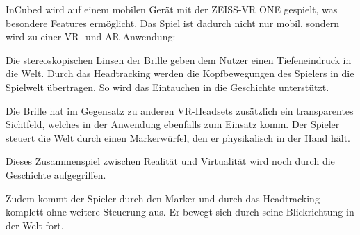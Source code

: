 
InCubed wird auf einem mobilen Gerät mit der ZEISS-VR ONE gespielt, was besondere Features ermöglicht. Das Spiel ist dadurch nicht nur mobil, sondern wird zu einer VR- und AR-Anwendung:

Die stereoskopischen Linsen der Brille geben dem Nutzer einen Tiefeneindruck in die Welt. Durch das Headtracking werden die Kopfbewegungen des Spielers in die Spielwelt übertragen. So wird das Eintauchen in die Geschichte unterstützt.

Die Brille hat im Gegensatz zu anderen VR-Headsets zusätzlich ein transparentes Sichtfeld, welches in der Anwendung ebenfalls zum Einsatz komm. Der Spieler steuert die Welt durch einen Markerwürfel, den er physikalisch in der Hand hält. 

Dieses Zusammenspiel zwischen Realität und Virtualität wird noch durch die Geschichte aufgegriffen.

Zudem kommt der Spieler durch den Marker und durch das Headtracking komplett ohne weitere Steuerung aus. Er bewegt sich durch seine Blickrichtung in der Welt fort.